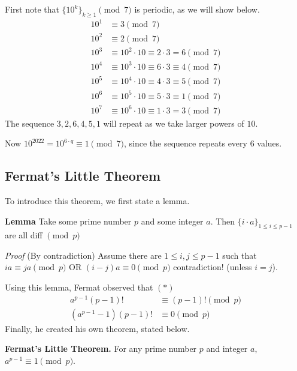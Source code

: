 \documentclass{article}
\begin{document}
    First note that $\{10^{k}\}_{k \ge 1} \pmod{7}$ is periodic, as we will show below.
    \begin{align*}
        10^{1} &\equiv 3 \pmod{7} \\
        10^{2} &\equiv 2 \pmod{7} \\
        10^{3} &\equiv 10^{2} \cdot 10 \equiv 2 \cdot 3 = 6 \pmod{7} \\
        10^{4} &\equiv 10^{3} \cdot 10 \equiv 6 \cdot 3 \equiv 4 \pmod{7} \\
        10^{5} &\equiv 10^{4} \cdot 10 \equiv 4 \cdot 3 \equiv 5 \pmod{7} \\
        10^{6} &\equiv 10^{5} \cdot 10 \equiv 5 \cdot 3 \equiv 1 \pmod{7} \\
        10^{7} &\equiv 10^{6} \cdot 10 \equiv 1 \cdot 3 = 3 \pmod{7}
    \end{align*}
    The sequence $3, 2, 6, 4, 5, 1$ will repeat as we take larger powers of $10$.
    
    \vspace{1.5mm} 
    Now $10^{2022} = 10^{6 \cdot q} \equiv 1 \pmod{7}$, since the sequence repeats every $6$ values.
    
\subsection*{Fermat's Little Theorem}
    To introduce this theorem, we first state a lemma.
    
    \vspace{1.5mm}
    \textbf{Lemma} Take some prime number $p$ and some integer $a$. Then $\{i \cdot a\}_{1 \le i \le p - 1}$ are all diff $\pmod{p}$
    
    \textit{Proof} (By contradiction) Assume there are $1 \le i, j \le p - 1$ such that $ia \equiv ja \pmod{p}$ OR $(i - j)a \equiv 0 \pmod{p}$ contradiction! (unless $i = j$).
    
    Using this lemma, Fermat observed that $(*)$
    \begin{align*}
        a^{p - 1}(p - 1)! &\equiv (p - 1)! \pmod{p} \\
        (a^{p - 1} - 1)(p - 1)! &\equiv 0 \pmod{p}
    \end{align*}
    Finally, he created his own theorem, stated below.
    
    \vspace{1.5mm}
    \textbf{Fermat's Little Theorem.} For any prime number $p$ and integer $a$, $a^{p - 1} \equiv 1 \pmod{p}$.
    
\end{document}

